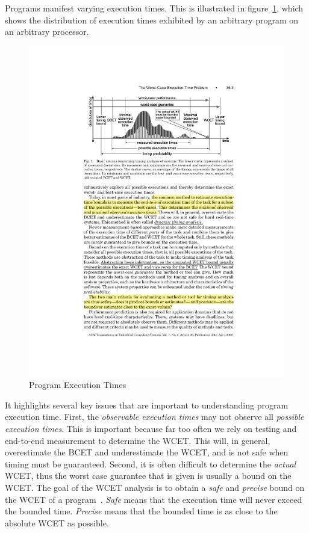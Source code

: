 Programs manifest varying execution times.
This is illustrated in figure~\ref{fig:program_execution_times}, which shows the distribution of execution times exhibited by an arbitrary program on an arbitrary processor.
\begin{figure}[h]
  \begin{center}
    \includegraphics{figs/program_executiontimes.pdf}
  \end{center}
  \vspace{-3mm}
  \caption{Program Execution Times~\cite{wilhelm-survey-paper}}
  \label{fig:program_execution_times}
\end{figure}
It highlights several key issues that are important to understanding program execution time.
First, the \emph{observable execution times} may not observe all \emph{possible execution times}.
This is important because far too often we rely on testing and end-to-end measurement to determine the WCET.
This will, in general, overestimate the BCET and underestimate the WCET, and is not safe when timing must be guaranteed. 
Second, it is often difficult to determine the \emph{actual} WCET, thus the worst case guarantee that is given is usually a bound on the WCET.    
The goal of the WCET analysis is to obtain a \textit{safe} and \textit{precise} bound on the WCET of a program~\cite{wilhelm-survey-paper}. 
\textit{Safe} means that the execution time will never exceed the bounded time. 
\textit{Precise} means that the bounded time is as close to the absolute WCET as possible. 

